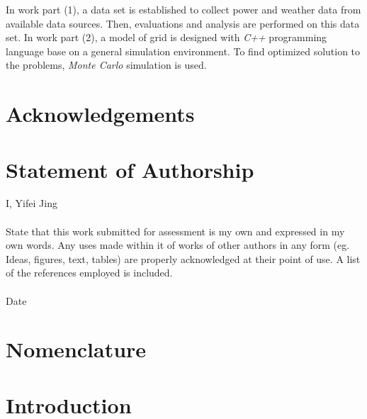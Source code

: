 \documentclass[12pt,a4paper]{report}
\begin{document}
        In work part (1), a data set is established to collect power and weather data from available data sources. Then, evaluations and analysis are performed on this data set.
        In work part (2), a model of grid is designed with \emph{C++} programming language base on a general simulation environment. To find optimized solution to the problems, \emph{Monte Carlo} simulation is used.

        
    \chapter*{Acknowledgements}
    
    \chapter*{Statement of Authorship}

        I, Yifei Jing \\ \\ 
        State that this work submitted for assessment is my own and expressed in my own words.
        Any uses made within it of works of other authors in any form (eg. Ideas, figures, text, tables)
        are properly acknowledged at their point of use. A list of the references employed is included.
        \\ \\Date 
    \chapter*{Nomenclature}
    \chapter{Introduction}
\end{document}
